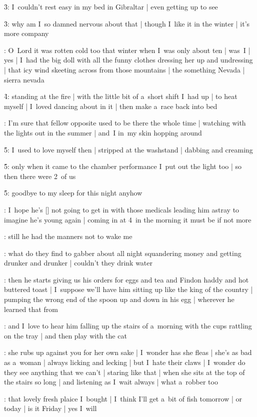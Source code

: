 \f3:
I~couldn't rest easy in my bed in Gibraltar |
even getting up to see

\f3:
why am I~so damned nervous about that |
though I~like it in the winter |
it's more company

:
O~Lord it was rotten cold too that winter when I~was only about ten |
was~I |
yes |
I~had the big doll with all the funny clothes
dressing her up and undressing |
that icy wind skeeting across from those mountains |
the something Nevada |
sierra nevada

\f4:
standing at the fire |
with the little bit of a~short shift I~had up |
to heat myself |
I~loved dancing about in it |
then make a~race back into bed

:
I'm sure that fellow opposite used to be there the whole time |
watching with the lights out in the summer |
and~I in~my skin hopping around

\f5:
I~used to love myself then |
stripped at the washstand |
dabbing and creaming

\f5:
only when it came to the chamber performance I~put out the light too |
so then there were 2~of us

\f5:
goodbye to my sleep for this night anyhow

:
I~hope he's [\bloom] not going to get in with those medicals
leading him astray to imagine he's young again |
coming in at 4~in the morning it must be if not more

:
still he had the manners not to wake me

:
what do they find to gabber about all night squandering money
and getting drunker and drunker |
couldn't they drink water

:
then he starts giving us his orders
for eggs and tea and Findon haddy and hot buttered toast |
I~suppose we'll have him sitting up like the king of the country |
pumping the wrong end of the spoon up and down in his egg |
wherever he learned that from

:
and I~love to hear him falling up the stairs of a~morning
with the cups rattling on the tray |
and then play with the cat

:
she rubs up against you for her own sake |
I~wonder has she fleas |
she's as bad as a~woman |
always licking and lecking |
but I~hate their claws |
I~wonder do they see anything that we can't |
staring like that |
when she sits at the top of the stairs so long |
and listening as I~wait always |
what a~robber too

:
that lovely fresh plaice I~bought |
I~think I'll get a~bit of fish tomorrow |
or today |
is it Friday |
yes I~will

